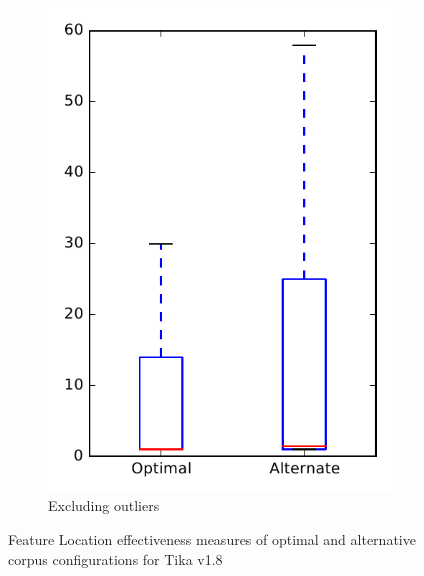 \begin{figure}
\begin{subfigure}{.4\textwidth}
        \includegraphics[height=0.4\textheight]{figures/combo/flt_rq2_tika_no_outlier}
        \caption{Excluding outliers}\label{fig:combo:flt:rq2:tika_no_outlier}
    \end{subfigure}
\caption{Feature Location effectiveness measures of optimal and alternative corpus configurations for Tika v1.8}
\label{fig:combo:flt:rq2:tika}
\end{figure}
